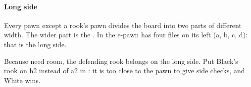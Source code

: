 \paragraph{Long side}

Every pawn except a rook's pawn divides the board into two parts of different width. The wider
part is the
.
In  the e-pawn has four files on its left (a, b, c, d): that is
the long side.

Because  need room, the defending rook belongs on the long
side. Put Black's rook on h2 instead of a2 in : it is too close to
the pawn to give side checks, and White wins.

